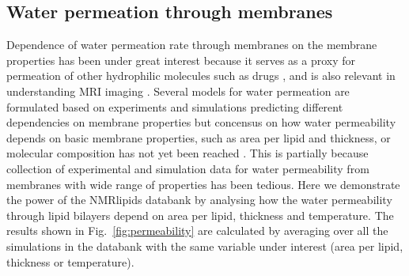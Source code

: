 \documentclass[fleqn,10pt]{wlscirep}
\begin{document}
\subsection{Water permeation through membranes}
Dependence of water permeation rate through membranes on the membrane properties has been under great interest because
it serves as a proxy for permeation of other hydrophilic molecules such as drugs \cite{??}, and is also relevant in understanding
MRI imaging \cite{??}. Several models for water permeation are formulated based on experiments and simulations predicting
different dependencies on membrane properties but concensus on how water permeability depends on basic membrane properties,
such as area per lipid and thickness, or molecular composition has not yet been reached \cite{shinoda16,venable19,??}.
This is partially because collection of experimental and simulation data for water permeability from membranes with
wide range of properties has been tedious.
Here we demonstrate the power of the NMRlipids databank by analysing how the water permeability through lipid bilayers depend
on area per lipid, thickness and temperature. The results shown in Fig.~\ref{fig:permeability} are calculated by averaging over
all the simulations in the databank with the same variable under interest (area per lipid, thickness or temperature).
\end{document}
